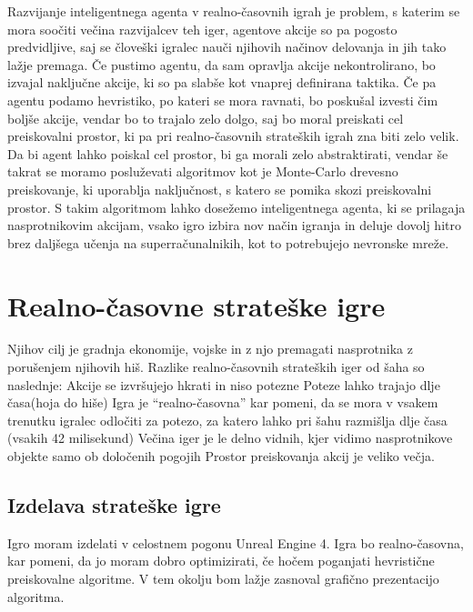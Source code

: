 \documentclass[a4paper, 12pt]{book}
\begin{document}
Razvijanje inteligentnega agenta v realno-časovnih igrah je problem, s katerim se mora soočiti večina razvijalcev teh iger, agentove akcije so pa pogosto predvidljive, saj se človeški igralec nauči njihovih načinov delovanja in jih tako lažje premaga.
Če pustimo agentu, da sam opravlja akcije nekontrolirano, bo izvajal naključne akcije, ki so pa slabše kot vnaprej definirana taktika.
Če pa agentu podamo hevristiko, po kateri se mora ravnati, bo poskušal izvesti čim boljše akcije, vendar bo to trajalo zelo dolgo, saj bo moral preiskati cel preiskovalni prostor, ki pa pri realno-časovnih strateških igrah zna biti zelo velik.
Da bi agent lahko poiskal cel prostor, bi ga morali zelo abstraktirati, vendar še takrat se moramo posluževati algoritmov kot je Monte-Carlo drevesno preiskovanje, ki uporablja naključnost, s katero se pomika skozi preiskovalni prostor.
S takim algoritmom lahko dosežemo inteligentnega agenta, ki se prilagaja nasprotnikovim akcijam, vsako igro izbira nov način igranja in deluje dovolj hitro brez daljšega učenja na superračunalnikih, kot to potrebujejo nevronske mreže.


\chapter{Realno-časovne strateške igre}
Njihov cilj je gradnja ekonomije, vojske in z njo premagati nasprotnika z porušenjem njihovih hiš.
Razlike realno-časovnih strateških iger od šaha so naslednje:
Akcije se izvršujejo hkrati in niso potezne
Poteze lahko trajajo dlje časa(hoja do hiše)
Igra je “realno-časovna” kar pomeni, da se mora v vsakem trenutku igralec odločiti za potezo, za katero lahko pri šahu razmišlja dlje časa (vsakih 42 milisekund)
Večina iger je le delno vidnih, kjer vidimo nasprotnikove objekte samo ob določenih pogojih
Prostor preiskovanja akcij je veliko večja.


\section{Izdelava strateške igre}
Igro moram izdelati v celostnem pogonu Unreal Engine 4.
Igra bo realno-časovna, kar pomeni, da jo moram dobro optimizirati, če hočem poganjati hevristične preiskovalne algoritme. V tem okolju bom lažje zasnoval grafično prezentacijo algoritma.
\end{document}
